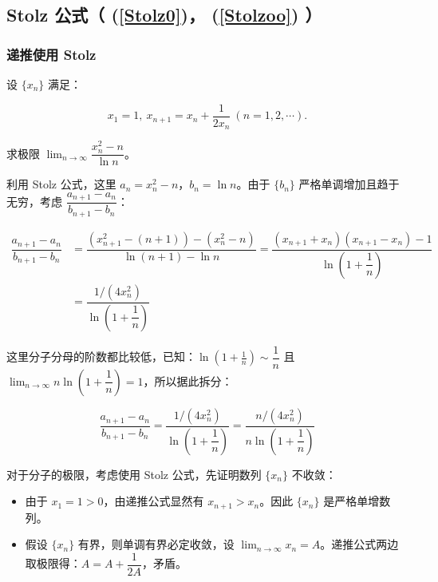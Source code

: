 \subsection{Stolz 公式（ (\ref{Stolz0})， (\ref{Stolzoo})  ）}

\subsubsection{递推使用 Stolz}

\begin{problem}

设 $\displaystyle \lbrace x_n \rbrace$ 满足：

$$
\displaystyle x_1 = 1, \ x_{n+1} = x_n + \dfrac{1}{2x_n} \ (n = 1, 2, \cdots) .
$$

求极限 $\displaystyle \lim_{n \to \infty} \dfrac{x_n^2 - n}{\ln n}$。

\end{problem}

利用 Stolz 公式，这里 $\displaystyle a_n = x_n^2 - n$，$\displaystyle b_n = \ln n$。由于 $\displaystyle \lbrace b_n \rbrace$ 严格单调增加且趋于无穷，考虑 $\displaystyle \dfrac{a_{n+1} - a_n}{b_{n+1} - b_n}$：

$$
\begin{aligned}\dfrac{a_{n+1} - a_n}{b_{n+1} - b_n}&=\dfrac{(x_{n+1}^2 - (n+1)) - (x_n^2 - n)}{\ln(n+1) - \ln n} = \dfrac{(x_{n+1}+ x_n) (x_{n+1}- x_n)- 1}{\ln(1 + \dfrac{1}{n})}\\
&=\dfrac{1/(4x_n^2)}{\ln(1 + \dfrac{1}{n})}\end{aligned}
$$

这里分子分母的阶数都比较低，已知：$\displaystyle \ln(1 + \frac{1}{n}) \sim \dfrac{1}{n}$ 且 $\displaystyle\lim_{n \to \infty} n\ln(1 + \dfrac{1}{n})=1$，所以据此拆分：

$$
\dfrac{a_{n+1} - a_n}{b_{n+1} - b_n}=\dfrac{1/(4x_n^2)}{\ln(1 + \dfrac{1}{n})}=\dfrac{n/(4x_n^2)}{n\ln(1 + \dfrac{1}{n})}
$$

对于分子的极限，考虑使用 Stolz 公式，先证明数列 $\{x_n\}$ 不收敛：

\begin{itemize}
  \item {由于 $\displaystyle x_1 = 1 > 0$，由递推公式显然有 $\displaystyle x_{n+1} > x_n$。因此 $\displaystyle \{x_n\}$ 是严格单增数列。}\item {假设 $\displaystyle \{x_n\}$ 有界，则单调有界必定收敛，设 $\displaystyle \lim_{n \to \infty} x_n = A$。递推公式两边取极限得：$\displaystyle A = A + \dfrac{1}{2A}$，矛盾。}
\end{itemize}

